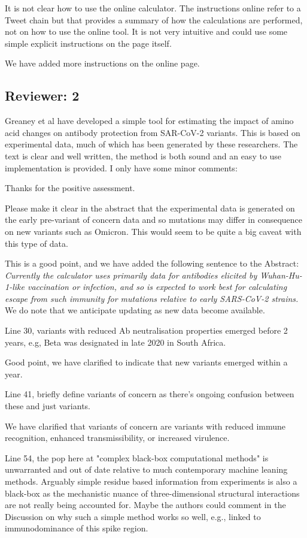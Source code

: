 \documentclass[11pt, oneside]{article}   	%
\newcommand{\response}[1]{{\color{black}#1}}
\begin{document}
It is not clear how to use the online calculator.  The instructions online refer to a Tweet chain but that provides a summary of how the calculations are performed, not on how to use the online tool.  It is not very intuitive and could use some simple explicit instructions on the page itself.

\response{We have added more instructions on the online page.}

\subsection*{Reviewer: 2}

Greaney et al have developed a simple tool for estimating the impact of amino acid changes on antibody protection from SAR-CoV-2 variants. This is based on experimental data, much of which has been generated by these researchers. The text is clear and well written, the method is both sound and an easy to use implementation is provided. I only have some minor comments:

\response{Thanks for the positive assessment.}

Please make it clear in the abstract that the experimental data is generated on the early pre-variant of concern data and so mutations may differ in consequence on new variants such as Omicron. This would seem to be quite a big caveat with this type of data.

\response{This is a good point, and we have added the following sentence to the Abstract: \emph{Currently the calculator uses primarily data for antibodies elicited by Wuhan-Hu-1-like vaccination or infection, and so is expected to work best for calculating escape from such immunity for mutations relative to early SARS-CoV-2 strains.} We do note that we anticipate updating as new data become available.}

Line 30, variants with reduced Ab neutralisation properties emerged before 2 years, e.g, Beta was designated in late 2020 in South Africa.

\response{Good point, we have clarified to indicate that new variants emerged within a year.}

Line 41, briefly define variants of concern as there's ongoing confusion between these and just variants.

\response{We have clarified that variants of concern are variants with reduced immune recognition, enhanced transmissibility, or increased virulence.}

Line 54, the pop here at "complex black-box computational methods" is unwarranted and out of date relative to much contemporary machine leaning methods. Arguably simple residue based information from experiments is also a black-box as the mechanistic nuance of three-dimensional structural interactions are not really being accounted for. Maybe the authors could comment in the Discussion on why such a simple method works so well, e.g., linked to immunodominance of this spike region.
\end{document}
